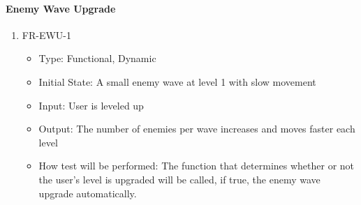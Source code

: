 \documentclass[12,english]{article}
\begin{document}
\paragraph{Enemy Wave Upgrade}
\begin{enumerate}
  \item FR-EWU-1
  \begin{itemize}
      \item Type: Functional, Dynamic
      \item Initial State: A small enemy wave at level 1 with slow movement
      \item Input: User is leveled up 
      \item Output: The number of enemies per wave increases and moves faster each level
      \item How test will be performed: The function that determines whether or not the user’s level is upgraded will be called, if true,  the enemy wave upgrade automatically.  
  \end{itemize}
\end{enumerate}
\end{document}
